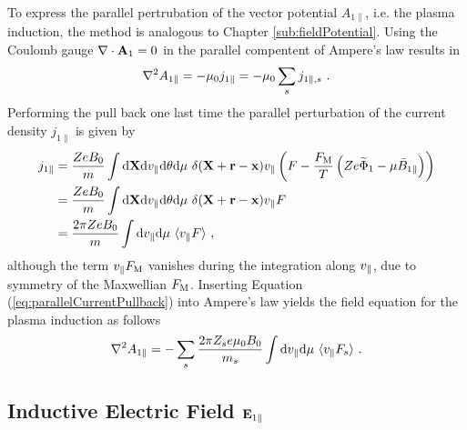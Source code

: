 To express the parallel pertrubation of the vector potential $A_{1\parallel}$, i.e. the plasma induction, the method is analogous to Chapter \ref{sub:fieldPotential}. Using the Coulomb gauge $\nabla \cdot \boldsymbol{\mathbf{A}}_1 = 0$ in the parallel compentent of Ampere's law results in
\begin{gather}
	\nabla^2 A_{1\parallel} = - \mu_0 j_{1\parallel} = - \mu_0 \sum_s j_{1\parallel,s}~.
	\label{eq:parallelAmpereLaw}
\end{gather}
Performing the pull back one last time the parallel perturbation of the current density $j_{1\parallel}$ is given by
\begin{gather}
	\begin{aligned}
		j_{1\parallel} &= \frac{Ze B_0}{m} \int \mathrm{d}\boldsymbol{\mathbf{X}}\mathrm{d}v_\parallel\mathrm{d}\theta\mathrm{d}\mu ~ \delta(\boldsymbol{\mathbf{X}} + \boldsymbol{\mathbf{r}} - \boldsymbol{\mathbf{x}}) v_\parallel \left(F - \frac{F_\mathrm{M}}{T}\left(Ze \widetilde{\Phi}_1 - \mu \bar{B}_{1\parallel}\right) \right)\\
					   &= \frac{Ze B_0}{m} \int \mathrm{d}\boldsymbol{\mathbf{X}}\mathrm{d}v_\parallel\mathrm{d}\theta\mathrm{d}\mu ~ \delta(\boldsymbol{\mathbf{X}} + \boldsymbol{\mathbf{r}} - \boldsymbol{\mathbf{x}}) v_\parallel F \\
					   &= \frac{2\pi Ze B_0}{m} \int \mathrm{d}v_\parallel\mathrm{d}\mu ~ \langle v_\parallel F\rangle~,
	\end{aligned}
	\label{eq:parallelCurrentPullback}
\end{gather}
although the term $v_\parallel F_\mathrm{M}$ vanishes during the integration along $v_\parallel$, due to symmetry of the Maxwellian $F_\mathrm{M}$. 
Inserting Equation (\ref{eq:parallelCurrentPullback}) into Ampere's law yields the field equation for the plasma induction as follows
\begin{gather}
	\nabla^2 A_{1\parallel} = - \sum_s \frac{2\pi Z_se \mu_0 B_0}{m_s}  \int \mathrm{d}v_\parallel\mathrm{d}\mu ~ \langle v_\parallel F_s\rangle~.
	\label{eq:fieldInduction}
\end{gather}
\newpage

\subsection{Inductive Electric Field $\boldsymbol{\mathbf{E}}_{1 \parallel}$}
\label{sub:fieldEpar}

